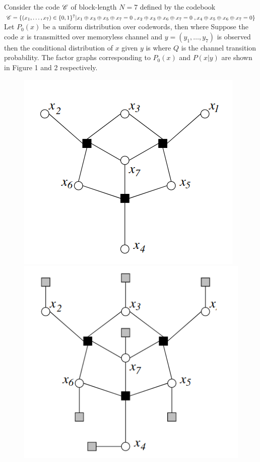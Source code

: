 \documentclass[letterpaper,english,10pt]{article}
\begin{document}
\begin{exmp}
Consider the code $\mathscr{C}$ of block-length $N=7$ defined by the codebook $\mathscr{C} = \{(x_1 ,\dots ,x_7) \in \{0,1\}^7 |
x_1 \oplus x_3 \oplus x_5 \oplus x_7 = 0 \; , x_2 \oplus x_3 \oplus x_6 \oplus x_7 = 0 \; , x_4 \oplus x_5 \oplus x_6 \oplus x_7 = 0 \}$
Let $P_0(x)$ be a uniform distribution over codewords, then
where 
Suppose the code $x$ is transmitted over memoryless channel and $y=(y_1,\dots,y_7)$ is observed then the conditional distribution of $x$ given
$y$ is 
where $Q$ is the channel transition probability. The factor graphs corresponding to $P_0(x)$ and $P(x|y)$ are shown in Figure 1 and 2 
respectively.

\begin{figure}
\centering
\begin{minipage}[t]{.5\textwidth}
  \centering
  \includegraphics[width=.4\linewidth]{exmpl_1_pic_1.png}
\end{minipage}%
\begin{minipage}[t]{.5\textwidth}
  \centering
  \includegraphics[width=.4\linewidth]{exmpl_1_pic_2.png}
\end{minipage}
\end{figure}

\end{exmp}
\end{document}
